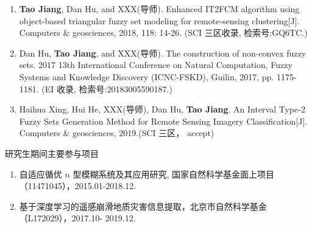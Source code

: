 \begin{paper}
  \begin{enumerate}
    \item \textbf{Tao Jiang}, Dan Hu, and XXX(导师).  Enhanced IT2FCM algorithm using object-based triangular fuzzy set modeling for remote-sensing clustering[J]. Computers \& geosciences, 2018, 118: 14-26. (SCI 三区收录, 检索号:GQ6TC.)
    \item Dan Hu, \textbf{Tao Jiang}, and XXX(导师). The construction of non-convex fuzzy sets. 2017 13th International Conference on Natural Computation, Fuzzy Systems and Knowledge  Discovery (ICNC-FSKD), Guilin, 2017, pp. 1175-1181. (EI 收录, 检索号:20183005590187.)
    \item Haihua Xing, Hui He, XXX(导师), Dan Hu, \textbf{Tao Jiang}.  An Interval Type-2 Fuzzy Sets Generation Method for Remote Sensing Imagery Classification[J]. Computers \& geosciences, 2019.(SCI 三区， accept) \\
  \end{enumerate}

\end{paper}





\begin{center}
  \large {\hei 研究生期间主要参与项目 }
\end{center}

\begin{enumerate}[(1)]
  \item 自适应循优 $n$ 型模糊系统及其应用研究, 国家自然科学基金面上项目（11471045），2015.01-2018.12.

  \item 基于深度学习的遥感崩滑地质灾害信息提取，北京市自然科学基金（L172029），2017.10-
        2019.12.\\

\end{enumerate}

